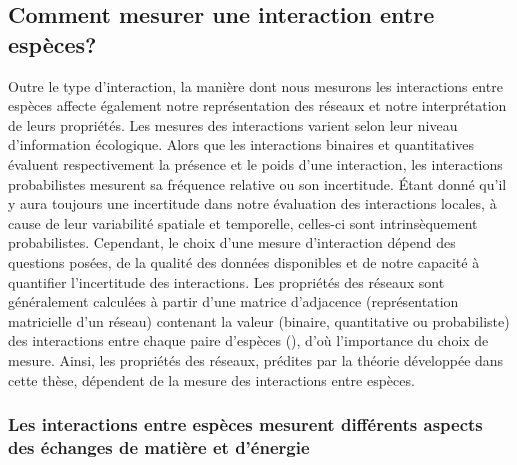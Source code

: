 \subsection{Comment mesurer une interaction entre espèces?} 

Outre le type d'interaction, la manière dont nous mesurons les interactions
entre espèces affecte également notre représentation des réseaux et notre
interprétation de leurs propriétés. Les mesures des interactions varient selon
leur niveau d'information écologique. Alors que les interactions binaires et
quantitatives évaluent respectivement la présence et le poids d'une interaction,
les interactions probabilistes mesurent sa fréquence relative ou son
incertitude. Étant donné qu'il y aura toujours une incertitude dans notre
évaluation des interactions locales, à cause de leur variabilité spatiale et
temporelle, celles-ci sont intrinsèquement probabilistes. Cependant, le choix
d'une mesure d'interaction dépend des questions posées, de la qualité des
données disponibles et de notre capacité à quantifier l'incertitude des
interactions. Les propriétés des réseaux sont généralement calculées à partir
d'une matrice d'adjacence (représentation matricielle d'un réseau) contenant la
valeur (binaire, quantitative ou probabiliste) des interactions entre chaque
paire d'espèces (\cite{Delmas2019Analysing}), d'où l'importance du choix de
mesure. Ainsi, les propriétés des réseaux, prédites par la théorie développée
dans cette thèse, dépendent de la mesure des interactions entre espèces. 

\subsubsection{Les interactions entre espèces mesurent différents aspects des échanges de matière et d'énergie} 

